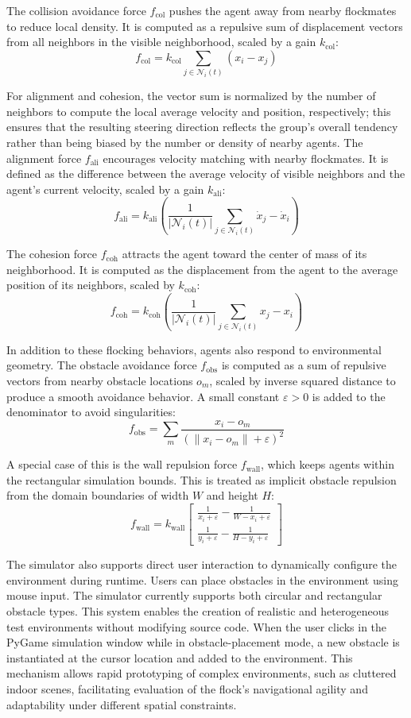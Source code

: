 \documentclass[12pt]{article}
\begin{document}
The collision avoidance force \(f_{\text{col}}\) pushes the agent away from nearby flockmates to reduce local density. It is computed as a repulsive sum of displacement vectors from all neighbors in the visible neighborhood, scaled by a gain \(k_{\text{col}}\):
\[ f_\text{col} = k_\text{col} \sum_{j \in \mathcal{N}_i(t)} (x_i - x_j) \]

For alignment and cohesion, the vector sum is normalized by the number of neighbors to compute the local average velocity and position, respectively; this ensures that the resulting steering direction reflects the group's overall tendency rather than being biased by the number or density of nearby agents. The alignment force \(f_\text{ali}\) encourages velocity matching with nearby flockmates. It is defined as the difference between the average velocity of visible neighbors and the agent’s current velocity, scaled by a gain \(k_\text{ali}\): 
\[ f_\text{ali} = k_\text{ali} \left( \frac{1}{|\mathcal{N}_i(t)|} \sum_{j \in \mathcal{N}_i(t)} \dot{x}_j - \dot{x}_i \right) \]

The cohesion force \(f_\text{coh}\) attracts the agent toward the center of mass of its neighborhood. It is computed as the displacement from the agent to the average position of its neighbors, scaled by \(k_\text{coh}\): 
\[ f_\text{coh} = k_\text{coh} \left( \frac{1}{|\mathcal{N}_i(t)|} \sum_{j \in \mathcal{N}_i(t)} x_j - x_i \right) \]

In addition to these flocking behaviors, agents also respond to environmental geometry. The obstacle avoidance force \(f_{\text{obs}}\) is computed as a sum of repulsive vectors from nearby obstacle locations \(o_m\), scaled by inverse squared distance to produce a smooth avoidance behavior. A small constant \(\varepsilon > 0\) is added to the denominator to avoid singularities:
\[ f_\text{obs} = \sum_m \frac{x_i - o_m}{\left( \|x_i - o_m\| + \varepsilon \right)^2} \]

A special case of this is the wall repulsion force \(f_\text{wall}\), which keeps agents within the rectangular simulation bounds. This is treated as implicit obstacle repulsion from the domain boundaries of width \(W\) and height \(H\): \[ f_\text{wall} = k_\text{wall} \begin{bmatrix}
\frac{1}{x_i + \varepsilon} - \frac{1}{W - x_i + \varepsilon} \\
\frac{1}{y_i + \varepsilon} - \frac{1}{H - y_i + \varepsilon}
\end{bmatrix} \]

The simulator also supports direct user interaction to dynamically configure the environment during runtime. Users can place obstacles in the environment using mouse input. The simulator currently supports both circular and rectangular obstacle types. This system enables the creation of realistic and heterogeneous test environments without modifying source code. When the user clicks in the PyGame simulation window while in obstacle-placement mode, a new obstacle is instantiated at the cursor location and added to the environment. This mechanism allows rapid prototyping of complex environments, such as cluttered indoor scenes, facilitating evaluation of the flock's navigational agility and adaptability under different spatial constraints.
\end{document}
